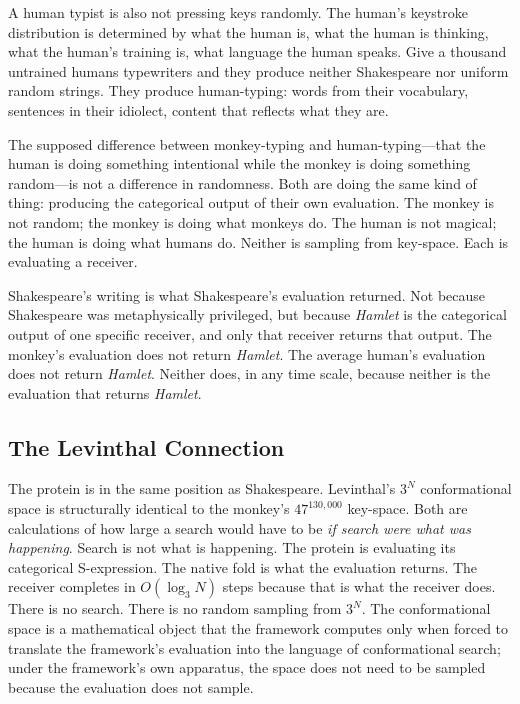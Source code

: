 \documentclass[11pt,twocolumn,a4paper]{article}
\theoremstyle{definition}
\theoremstyle{remark}
\begin{document}
A human typist is also not pressing keys randomly.  The human's keystroke
distribution is determined by what the human is, what the human is thinking,
what the human's training is, what language the human speaks.  Give a thousand
untrained humans typewriters and they produce neither Shakespeare nor uniform
random strings.  They produce human-typing: words from their vocabulary,
sentences in their idiolect, content that reflects what they are.

The supposed difference between monkey-typing and human-typing---that the
human is doing something intentional while the monkey is doing something
random---is not a difference in randomness.  Both are doing the same kind of
thing: producing the categorical output of their own evaluation.  The monkey
is not random; the monkey is doing what monkeys do.  The human is not
magical; the human is doing what humans do.  Neither is sampling from
key-space.  Each is evaluating a receiver.

Shakespeare's writing is what Shakespeare's evaluation returned.  Not because
Shakespeare was metaphysically privileged, but because \textit{Hamlet} is the
categorical output of one specific receiver, and only that receiver returns
that output.  The monkey's evaluation does not return \textit{Hamlet}.  The
average human's evaluation does not return \textit{Hamlet}.  Neither does,
in any time scale, because neither is the evaluation that returns \textit{Hamlet}.

\subsection{The Levinthal Connection}

The protein is in the same position as Shakespeare.  Levinthal's $3^N$
conformational space is structurally identical to the monkey's $47^{130{,}000}$
key-space.  Both are calculations of how large a search would have to be
\emph{if search were what was happening}.  Search is not what is happening.
The protein is evaluating its categorical S-expression.  The native fold is
what the evaluation returns.  The receiver completes in $O(\log_3 N)$ steps
because that is what the receiver does.  There is no search.  There is no
random sampling from $3^N$.  The conformational space is a mathematical object
that the framework computes only when forced to translate the framework's
evaluation into the language of conformational search; under the framework's
own apparatus, the space does not need to be sampled because the evaluation
does not sample.
\end{document}

